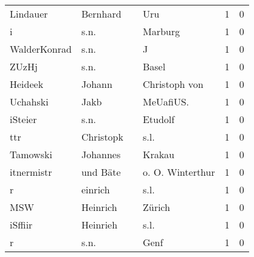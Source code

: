 \begin{tabular}{llllrr}
                 Lindauer &                           Bernhard &             &                                         Uru &          1 &         0 \\
                        i &                               s.n. &             &                                     Marburg &          1 &         0 \\
             WalderKonrad &                               s.n. &             &                                           J &          1 &         0 \\
                    ZUzHj &                               s.n. &             &                                       Basel &          1 &         0 \\
                  Heideek &                             Johann &             &                               Christoph von &          1 &         0 \\
                 Uchahski &                               Jakb &             &                                  MeUafiUS.  &          1 &         0 \\
                  iSteier &                               s.n. &             &                                     Etudolf &          1 &         0 \\
                      ttr &                          Christopk &             &                                        s.l. &          1 &         0 \\
                 Tamowski &                           Johannes &             &                                      Krakau &          1 &         0 \\
               itnermistr &                           und Bäte &             &                            o. O. Winterthur &          1 &         0 \\
                        r &                            einrich &             &                                        s.l. &          1 &         0 \\
                      MSW &                           Heinrich &             &                                      Zürich &          1 &         0 \\
                  iSffiir &                           Heinrieh &             &                                        s.l. &          1 &         0 \\
                        r &                               s.n. &             &                                        Genf &          1 &         0 \\

\end{tabular}

